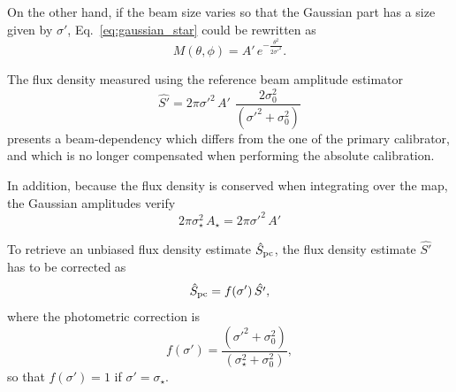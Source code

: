 On the other hand, if the beam size varies so that the Gaussian part has a size given by
$\sigma'$, Eq.~\ref{eq:gaussian_star} could be rewritten as 
\begin{equation}
  M(\theta, \phi) = A'\, e^{-\frac{\theta^{2}}{2\sigma'^{2}}}.
  \label{eq:broader_beam_map}
\end{equation}

The flux density measured using the reference beam amplitude estimator 
\begin{equation}
  \hat{S'}  =2\pi \sigma'^2 \, A' \, \,  \frac{2 \sigma_0^2}{(\sigma'^2 + \sigma_0^2)}
\end{equation}
presents a beam-dependency which differs from the one of the primary
calibrator, and which is no longer compensated when performing the
absolute calibration.

{\lp In addition, because the flux density is conserved when integrating over the map,
the Gaussian amplitudes verify
\begin{equation}
2\pi \sigma_{\star}^2 \, A_{\star} = 2\pi \sigma'^2 \, A'
\label{eq:gaussian_amplitude}
\end{equation}}

To retrieve an unbiased flux density estimate $\hat{S}_{\rm{pc}}$, the
flux density estimate $\hat{S'}$ has to be corrected as
\begin{equation}
  \hat{S}_{\rm{pc}} = f(\sigma') \, \hat{S'},
\end{equation} 
where the photometric correction is 
\begin{equation}
  f(\sigma') = \frac{(\sigma'^2 + \sigma_0^2)}{(\sigma_\star^2+\sigma_0^2)}, 
\end{equation} 
so that $f(\sigma') = 1$ if $\sigma'=\sigma_\star$.

